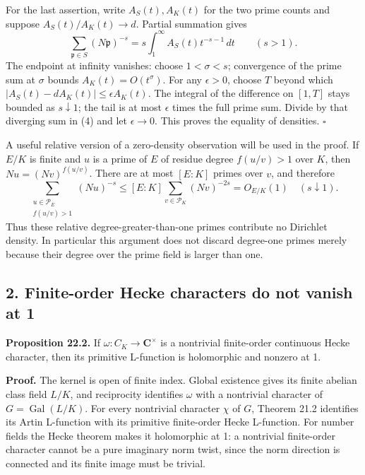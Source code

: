\documentclass[11pt,a4paper]{article}
\begin{document}
For the last assertion, write \(A_S(t),A_K(t)\) for the two prime counts
and suppose \(A_S(t)/A_K(t)\to d\). Partial summation gives \[
\sum_{\mathfrak p\in S}(N\mathfrak p)^{-s}
=s\int_1^\infty A_S(t)t^{-s-1}\,dt
\qquad(s>1).
\tag{5}
\] The endpoint at infinity vanishes: choose \(1<\sigma<s\); convergence
of the prime sum at \(\sigma\) bounds \(A_K(t)=O(t^\sigma)\). For any
\(\epsilon>0\), choose \(T\) beyond which
\(|A_S(t)-dA_K(t)|\leq\epsilon A_K(t)\). The integral of the difference
on \([1,T]\) stays bounded as \(s\downarrow1\); the tail is at most
\(\epsilon\) times the full prime sum. Divide by that diverging sum in
(4) and let \(\epsilon\to0\). This proves the equality of densities.
\(\square\)

A useful relative version of a zero-density observation will be used in
the proof. If \(E/K\) is finite and \(u\) is a prime of \(E\) of residue
degree \(f(u/v)>1\) over \(K\), then \(Nu=(Nv)^{f(u/v)}\). There are at
most \([E:K]\) primes over \(v\), and therefore \[
\sum_{\substack{u\in\mathcal P_E\\f(u/v)>1}}(Nu)^{-s}
\leq[E:K]\sum_{v\in\mathcal P_K}(Nv)^{-2s}=O_{E/K}(1)
\quad(s\downarrow1).
\tag{6}
\] Thus these relative degree-greater-than-one primes contribute no
Dirichlet density. In particular this argument does not discard
degree-one primes merely because their degree over the prime field is
larger than one.

\subsection{2. Finite-order Hecke characters do not vanish at
1}\label{finite-order-hecke-characters-do-not-vanish-at-1}

\textbf{Proposition 22.2.} If \(\omega:C_K\to\mathbf C^\times\) is a
nontrivial finite-order continuous Hecke character, then its primitive
L-function is holomorphic and nonzero at 1.

\textbf{Proof.} The kernel is open of finite index. Global existence
gives its finite abelian class field \(L/K\), and reciprocity identifies
\(\omega\) with a nontrivial character of \(G=\operatorname{Gal}(L/K)\).
For every nontrivial character \(\chi\) of \(G\), Theorem 21.2
identifies its Artin L-function with its primitive finite-order Hecke
L-function. For number fields the Hecke theorem makes it holomorphic at
1: a nontrivial finite-order character cannot be a pure imaginary norm
twist, since the norm direction is connected and its finite image must
be trivial.
\end{document}
